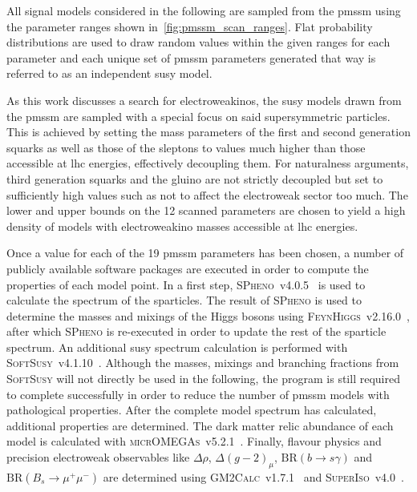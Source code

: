 All signal models considered in the following are sampled from the \gls{pmssm} using the parameter ranges shown in~\cref{fig:pmssm_scan_ranges}. Flat probability distributions are used to draw random values within the given ranges for each parameter and each unique set of \gls{pmssm} parameters generated that way is referred to as an independent \gls{susy} model. 

As this work discusses a search for electroweakinos, the \gls{susy} models drawn from the \gls{pmssm} are sampled with a special focus on said supersymmetric particles. This is achieved by setting the mass parameters of the first and second generation squarks as well as those of the sleptons to values much higher than those accessible at \gls{lhc} energies, effectively decoupling them. For naturalness arguments, third generation squarks and the gluino are not strictly decoupled but set to sufficiently high values such as not to affect the electroweak sector too much. The lower and upper bounds on the 12 scanned parameters are chosen to yield a high density of models with electroweakino masses accessible at \gls{lhc} energies. 

Once a value for each of the 19 \gls{pmssm} parameters has been chosen, a number of publicly available software packages are executed in order to compute the properties of each model point. In a first step, \textsc{SPheno}~v4.0.5~\cite{spheno_1:2003um,spheno_2:2011nf} is used to calculate the spectrum of the sparticles. The result of \textsc{SPheno} is used to determine the masses and mixings of the Higgs bosons using \textsc{FeynHiggs}~v2.16.0~\cite{FeynHiggs:1998yj,FeynHiggs_1:2018qog,FeynHiggs_2:2013ria}, after which \textsc{SPheno} is re-executed in order to update the rest of the sparticle spectrum. An additional \gls{susy} spectrum calculation is performed with \textsc{SoftSusy}~v4.1.10~\cite{softsusy:2001kg}. Although the masses, mixings and branching fractions from \textsc{SoftSusy} will not directly be used in the following, the program is still required to complete successfully in order to reduce the number of \gls{pmssm} models with pathological properties. After the complete model spectrum has calculated, additional properties are determined. The dark matter relic abundance of each model is calculated with \textsc{micrOMEGAs}~v5.2.1~\cite{micromegas_1:2006is,micromegas_2:2010pz}. Finally, flavour physics and precision electroweak observables like $\Delta\rho$, $\Delta(g-2)_\mu$, $\mathrm{BR}(b\rightarrow s\gamma)$ and $\mathrm{BR}(B_s\rightarrow \mu^+\mu^-)$ are determined using \textsc{GM2Calc}~v1.7.1~\cite{gm2:2015rva} and \textsc{SuperIso}~v4.0~\cite{superiso:2008tp}.

